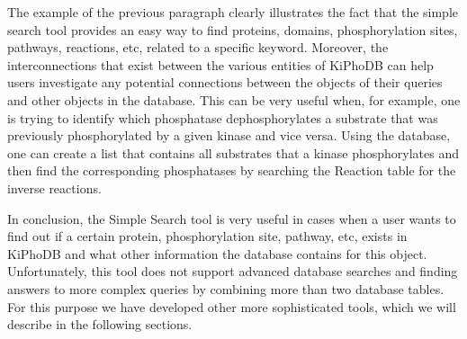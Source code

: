 The example of the previous paragraph clearly illustrates the fact that the simple search tool provides an easy way to find proteins, domains, phosphorylation sites, pathways, reactions, etc, related to a specific keyword.
Moreover, the interconnections that exist between the various entities of KiPhoDB can help users investigate any potential connections between the objects of their queries and other objects in the database.
This can be very useful when, for example, one is trying to identify which phosphatase dephosphorylates a substrate that was previously phosphorylated by a given kinase and vice versa.
Using the database, one can create a list that contains all substrates that a kinase phosphorylates and then find the corresponding phosphatases by searching the Reaction table for the inverse reactions.

In conclusion, the Simple Search tool is very useful in cases when a user wants to find out if a certain protein, phosphorylation site, pathway, etc, exists in KiPhoDB and what other information the database contains for this object.
Unfortunately, this tool does not support advanced database searches and finding answers to more complex queries by combining more than two database tables.
For this purpose we have developed other more sophisticated tools, which we will describe in the following sections.

